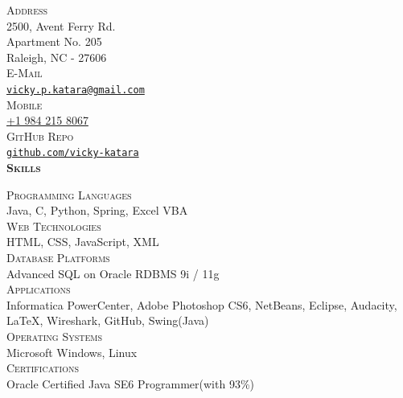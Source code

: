 \documentclass[letterpaper,12pt,final]{memoir}
\newcommand{\Sep}{\vspace{1.5em}}
\newcommand{\SmallSep}{\vspace{0.5em}}
\newcommand{\CVSection}[1]
	{\Large\textbf{\textsc{{#1}}}\par
	\SmallSep\normalsize\normalfont}
\newcommand{\CVItemSC}[1]
{{\textsc{\color{Plum} #1}}}
\begin{document}

\begin{flushright} 
	\footnotesize
	\SmallSep
	\CVItemSC{Address}\\%
	
	2500, Avent Ferry Rd.\\
	Apartment No. 205\\
	Raleigh, NC - 27606\\
	\Sep
	\CVItemSC{E-Mail}\\%
	\href{mailto:vicky.p.katara@gmail.com}{\texttt{vicky.p.katara@gmail.com}}\\
	\Sep
	\CVItemSC{Mobile}\\%
	\href{tel:+19842158067}{+1 984 215 8067}\\
	\SmallSep
	\Sep
	\CVItemSC{GitHub Repo}\\%
	\href{https://github.com/vicky-katara}{\texttt{github.com/vicky-katara}}\\
	\SmallSep
\SmallSep
\CVSection{Skills}
\CVItemSC{Programming Languages}\\
{\footnotesize Java, C, Python, Spring, Excel VBA}
\SmallSep\\
\CVItemSC{Web Technologies}\\
{\footnotesize HTML, CSS, JavaScript, XML}
\SmallSep\\
\CVItemSC{Database Platforms}\\
{\footnotesize Advanced SQL on Oracle RDBMS 9i / 11g}
\SmallSep\\
\CVItemSC{Applications}\\
{\footnotesize Informatica PowerCenter, Adobe Photoshop CS6, NetBeans, Eclipse, Audacity, \LaTeX, Wireshark, GitHub, Swing(Java)}
\SmallSep\\
\CVItemSC{Operating Systems}\\
{\footnotesize Microsoft Windows, Linux}
\SmallSep\\
\CVItemSC{Certifications}\\
{\footnotesize Oracle Certified Java SE6 Programmer\space(with 93\%)}
\end{flushright}\normalsize
\end{document}
